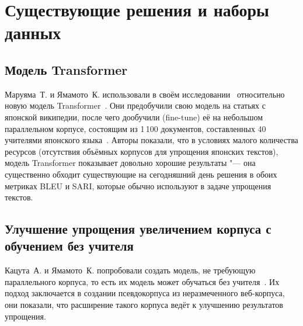 

\chapter{Существующие решения и наборы данных}\label{ch2}






\section{Модель Transformer}


Маруяма~Т. и Ямамото~К. использовали в своём исследовании~\cite{Transformer2019} относительно новую модель Transformer~\cite{vaswani2017attention}.
Они предобучили свою модель на статьях с японской википедии, после чего дообучили (fine-tune) её на небольшом параллельном корпусе, состоящим из 1\,100 документов, составленных 40 учителями японского языка~\cite{moku-yamamoto-2012-automatic}.
Авторы показали, что в условиях малого количества ресурсов (отсутствия объёмных корпусов для упрощения японских текстов), модель Transformer показывает довольно хорошие результаты "--- она существенно обходит существующие на сегодняшний день решения в обоих метриках BLEU и SARI, которые обычно используют в задаче упрощения текстов.


\section{Улучшение упрощения увеличением корпуса с обучением без учителя}


Кацута~А. и Ямамото~К. попробовали создать модель, не требующую параллельного корпуса, то есть их модель может обучаться без учителя~\cite{Unsupervised2019}.
Их подход заключается в создании псевдокорпуса из неразмеченного веб-корпуса, они показали, что расширение такого корпуса ведёт к улучшению результатов упрощения.


